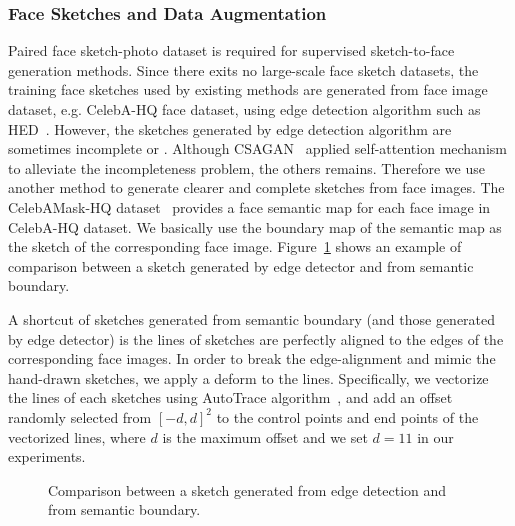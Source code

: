 
\subsubsection{Face Sketches and Data Augmentation}
Paired face sketch-photo dataset is required for supervised sketch-to-face generation methods.
Since there exits no large-scale face sketch datasets, the training face sketches used by existing methods are generated from face image dataset, e.g. CelebA-HQ face dataset, using edge detection algorithm such as HED~\cite{HED}.
However, the sketches generated by edge detection algorithm are sometimes incomplete or . Although CSAGAN~\cite{CSAGAM} applied self-attention mechanism to alleviate the incompleteness problem, the others remains. Therefore we use another method to generate clearer and complete sketches from face images.
The CelebAMask-HQ dataset~\cite{CelebAMask-HQ} provides a face semantic map for each face image in CelebA-HQ dataset. We basically use the boundary map of the semantic map as the sketch of the corresponding face image. Figure~\ref{fig:sketch_data} shows an example of comparison between a sketch generated by edge detector and from semantic boundary.

A shortcut of sketches generated from semantic boundary (and those generated by edge detector) is the lines of sketches are perfectly aligned to the edges of the corresponding face images. In order to break the edge-alignment and mimic the hand-drawn sketches, we apply a deform to the lines. Specifically, we vectorize the lines of each sketches using AutoTrace algorithm~\cite{AutoTrace}, and add an offset randomly selected from $[-d, d]^2$ to the control points and end points of the vectorized lines, where $d$ is the maximum offset and we set $d=11$ in our experiments.


\begin{figure}
	\centering
	\vspace{1.0cm}
	\caption{Comparison between a sketch generated from edge detection and from semantic boundary.}
	\label{fig:sketch_data}
\end{figure}